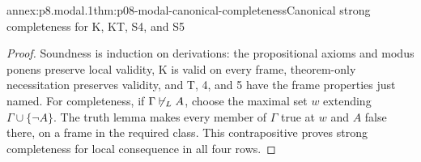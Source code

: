 \begin{annexitem}{annex:p8.modal.1}{thm:p08-modal-canonical-completeness}{Canonical strong completeness for K, KT, S4, and S5}
\begin{proof}
Soundness is induction on derivations: the propositional axioms and modus
ponens preserve local validity, K is valid on every frame, theorem-only
necessitation preserves validity, and T, 4, and 5 have the frame properties
just named.  For completeness, if
\(\Gamma\not\vdash_L A\), choose the maximal set \(w\) extending
\(\Gamma\cup\{\neg A\}\).  The truth lemma makes every member of \(\Gamma\)
true at \(w\) and \(A\) false there, on a frame in the required class.  This
contrapositive proves strong completeness for local consequence in all four
rows.
\end{proof}
\end{annexitem}
